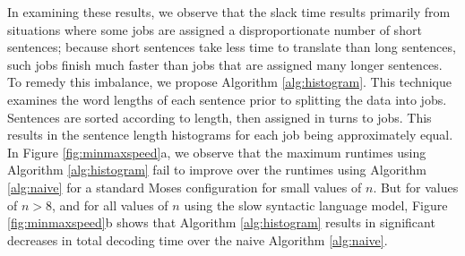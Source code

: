 \documentclass{pbml}
\begin{document}
In examining these results, we observe that the slack time results primarily from situations where some jobs are assigned a disproportionate number of short sentences; because short sentences take less time to translate than long sentences, such jobs finish much faster than jobs that are assigned many longer sentences. To remedy this imbalance, we propose Algorithm \ref{alg:histogram}. This technique examines the word lengths of each sentence prior to splitting the data into jobs. Sentences are sorted according to length, then assigned in turns to jobs. This results in the sentence length histograms for each job being approximately equal. 
%
%
%
%
%
%
In Figure \ref{fig:minmaxspeed}a, we observe that the maximum runtimes using Algorithm \ref{alg:histogram} fail to improve over the runtimes using Algorithm \ref{alg:naive} for a standard Moses configuration for small values of $n$. But for values of $n>8$, and for all values of $n$ using the slow syntactic language model, Figure \ref{fig:minmaxspeed}b shows that Algorithm \ref{alg:histogram} results in significant decreases in total decoding time over the naive Algorithm \ref{alg:naive}.
\end{document}
